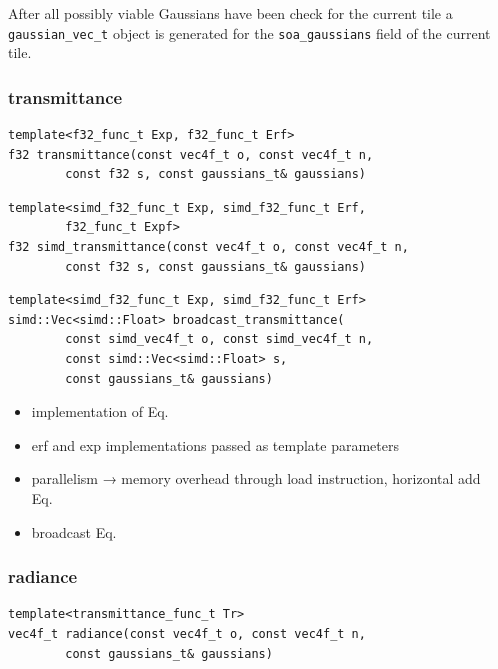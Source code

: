 \documentclass[a4paper, 11pt]{memoir}
\begin{document}
    After all possibly viable Gaussians have been check for the current tile a \texttt{gaussian_vec_t} object
    is generated for the \texttt{soa_gaussians} field of the current tile.

    \subsubsection{\gls{transmittance}}

    \begin{verbatim}
template<f32_func_t Exp, f32_func_t Erf>
f32 transmittance(const vec4f_t o, const vec4f_t n,
        const f32 s, const gaussians_t& gaussians)
    \end{verbatim}
    
    \begin{verbatim}
template<simd_f32_func_t Exp, simd_f32_func_t Erf,
        f32_func_t Expf>
f32 simd_transmittance(const vec4f_t o, const vec4f_t n,
        const f32 s, const gaussians_t& gaussians)
    \end{verbatim}
    
    \begin{verbatim}
template<simd_f32_func_t Exp, simd_f32_func_t Erf>
simd::Vec<simd::Float> broadcast_transmittance(
        const simd_vec4f_t o, const simd_vec4f_t n,
        const simd::Vec<simd::Float> s,
        const gaussians_t& gaussians)
    \end{verbatim}

    \begin{itemize}
        \item implementation of Eq.~
        \item erf and exp implementations passed as template parameters
        \item parallelism →  memory overhead through load instruction, horizontal add Eq.~
        \item broadcast Eq.~
    \end{itemize}
    
    \subsubsection{\gls{radiance}}

    \begin{verbatim}
template<transmittance_func_t Tr>
vec4f_t radiance(const vec4f_t o, const vec4f_t n,
        const gaussians_t& gaussians)
    \end{verbatim}
    
\end{document}
